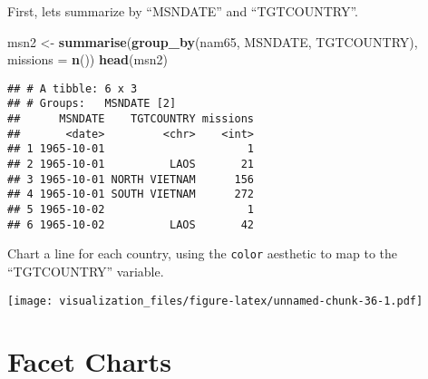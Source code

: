 \documentclass[oneside]{memoir}
\newenvironment{Shaded}{\begin{snugshade}}{\end{snugshade}}
\newcommand{\KeywordTok}[1]{\textcolor[rgb]{0.13,0.29,0.53}{\textbf{#1}}}
\newcommand{\DataTypeTok}[1]{\textcolor[rgb]{0.13,0.29,0.53}{#1}}
\newcommand{\DecValTok}[1]{\textcolor[rgb]{0.00,0.00,0.81}{#1}}
\newcommand{\StringTok}[1]{\textcolor[rgb]{0.31,0.60,0.02}{#1}}
\newcommand{\OperatorTok}[1]{\textcolor[rgb]{0.81,0.36,0.00}{\textbf{#1}}}
\newcommand{\NormalTok}[1]{#1}
\theoremstyle{definition}
\theoremstyle{definition}
\theoremstyle{definition}
\theoremstyle{remark}
\begin{document}
First, lets summarize by ``MSNDATE'' and ``TGTCOUNTRY''.

\begin{Shaded}
\begin{Highlighting}[]
\NormalTok{msn2 <-}\StringTok{ }\KeywordTok{summarise}\NormalTok{(}\KeywordTok{group_by}\NormalTok{(nam65, MSNDATE, TGTCOUNTRY), }\DataTypeTok{missions =} \KeywordTok{n}\NormalTok{())}
\KeywordTok{head}\NormalTok{(msn2)}
\end{Highlighting}
\end{Shaded}

\begin{verbatim}
## # A tibble: 6 x 3
## # Groups:   MSNDATE [2]
##      MSNDATE    TGTCOUNTRY missions
##       <date>         <chr>    <int>
## 1 1965-10-01                      1
## 2 1965-10-01          LAOS       21
## 3 1965-10-01 NORTH VIETNAM      156
## 4 1965-10-01 SOUTH VIETNAM      272
## 5 1965-10-02                      1
## 6 1965-10-02          LAOS       42
\end{verbatim}

Chart a line for each country, using the \texttt{color} aesthetic to map
to the ``TGTCOUNTRY'' variable.

\begin{Shaded}
\end{Shaded}

\texttt{[image: visualization\_files/figure-latex/unnamed-chunk-36-1.pdf]}

\section{Facet Charts}\label{facet-charts}
\end{document}
